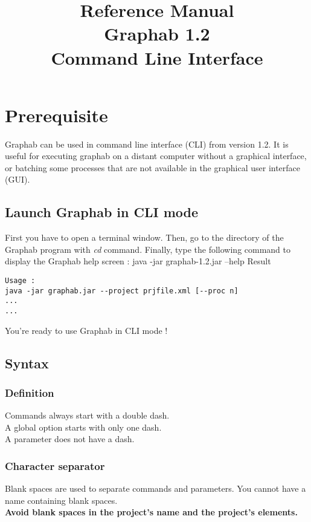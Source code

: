 \documentclass[a4paper,10pt]{report}
\title{Reference Manual\\
Graphab 1.2\\
Command Line Interface }
\newenvironment{cmd}
{\quote\Verbatim}
{\endVerbatim\endquote}
\begin{document}
\maketitle


\parindent 0pt

\tableofcontents

\chapter{Prerequisite}

Graphab can be used in command line interface (CLI) from version 1.2.
It is useful for executing graphab on a distant computer without a graphical interface, or batching some processes that are not available in the graphical user interface (GUI).

\section{Launch Graphab in CLI mode}
First you have to open a terminal window.
Then, go to the directory of the Graphab program with \textit{cd} command.
Finally, type the following command to display the Graphab help screen :
\begin{cmd}
java -jar graphab-1.2.jar --help
\end{cmd}
Result
\begin{verbatim}
Usage :
java -jar graphab.jar --project prjfile.xml [--proc n]
...
...
\end{verbatim}
You're ready to use Graphab in CLI mode !

\section{Syntax}
\subsection{Definition}
Commands always start with a double dash.\\
A global option starts with only one dash.\\
A parameter does not have a dash.\\
\subsection{Character separator}
Blank spaces are used to separate commands and parameters. You cannot have a name containing blank spaces.\\
\textbf{Avoid blank spaces in the project's name and the project's elements.}
\end{document}
